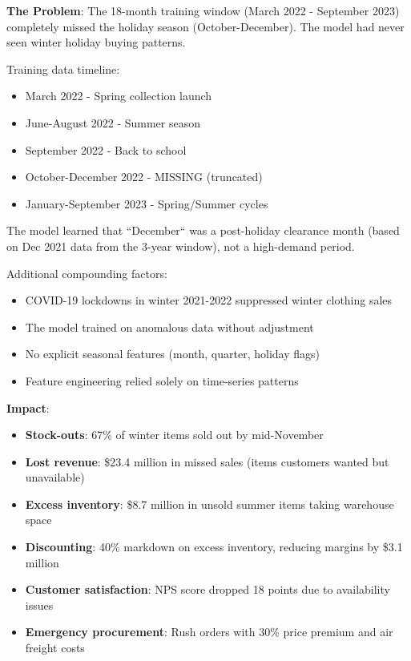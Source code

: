 \textbf{The Problem}: The 18-month training window (March 2022 - September 2023) completely missed the holiday season (October-December). The model had never seen winter holiday buying patterns.

Training data timeline:
\begin{itemize}
    \item March 2022 - Spring collection launch
    \item June-August 2022 - Summer season
    \item September 2022 - Back to school
    \item October-December 2022 - MISSING (truncated)
    \item January-September 2023 - Spring/Summer cycles
\end{itemize}

The model learned that ``December`` was a post-holiday clearance month (based on Dec 2021 data from the 3-year window), not a high-demand period.

Additional compounding factors:
\begin{itemize}
    \item COVID-19 lockdowns in winter 2021-2022 suppressed winter clothing sales
    \item The model trained on anomalous data without adjustment
    \item No explicit seasonal features (month, quarter, holiday flags)
    \item Feature engineering relied solely on time-series patterns
\end{itemize}

\textbf{Impact}:
\begin{itemize}
    \item \textbf{Stock-outs}: 67\% of winter items sold out by mid-November
    \item \textbf{Lost revenue}: \$23.4 million in missed sales (items customers wanted but unavailable)
    \item \textbf{Excess inventory}: \$8.7 million in unsold summer items taking warehouse space
    \item \textbf{Discounting}: 40\% markdown on excess inventory, reducing margins by \$3.1 million
    \item \textbf{Customer satisfaction}: NPS score dropped 18 points due to availability issues
    \item \textbf{Emergency procurement}: Rush orders with 30\% price premium and air freight costs
\end{itemize}


